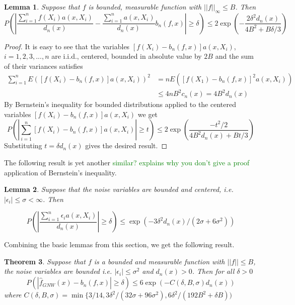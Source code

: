 \documentclass{article}
\newtheorem{theorem}{Theorem}[section]
\newtheorem{lemma}[theorem]{Lemma}
\newcommand\SB[1]{\textcolor{green}{#1}}
\begin{document}
\begin{lemma}
\label{basic_lemma_1}
Suppose that $f$ is bounded, measurable function with  $||f||_{\infty}\leq B$. Then 
\begin{equation*}
P(|\frac{\sum_{i=1}^nf(X_i)a(x,X_i)}{d_n(x)}-\frac{\sum_{i=1}^na(x,X_i)}{d_n(x)}b_n(f,x)|\geq \delta)\leq 2\exp(-\frac{2\delta^2d_n(x)}{4B^2+B\delta/3})
\end{equation*}
\end{lemma}
\begin{proof}
It is easy to see that the variables  $[f(X_i)-b_n(f,x)]a(x,X_i)$, $i=1,2,3,...,n$ are i.i.d., centered, bounded in absolute value by $2B$ and the sum of their variances satisfies 
\begin{equation*}
\begin{split}
    \sum_{i=1}^nE([f(X_i)-b_n(f,x)]a(x,X_i))^2&=nE([f(X_1)-b_n(f,x)]^2a(x,X_i))\\
    &\leq 4nB^2c_n(x)=4B^2d_n(x)
\end{split}
\end{equation*}
By Bernstein's inequality for bounded distributions applied to the centered variables $[f(X_i)-b_n(f,x)]a(x,X_i)$ we get
\begin{equation*}
    P(|\sum_{i=1}^n[f(X_i)-b_n(f,x)]a(x,X_i)|\geq t)\leq 2\exp(\frac{-t^2/2}{4B^2d_n(x)+Bt/3})
\end{equation*}
Substituting $t=\delta d_n(x)$ gives the desired result.
\end{proof}
The following result is yet another \SB{similar? explains why you don't give a
  proof} application of Bernstein's inequality.
\begin{lemma}
\label{basic_lemma_2}
Suppose that the noise variables are bounded and centered, i.e. $|\epsilon_i|\leq \sigma<\infty$. Then

\begin{equation*}
    P(|\frac{\sum_{i=1}^n \epsilon_{i}a(x,X_i)}{d_n(x)}|\geq \delta)\leq \exp(-3\delta^2d_n(x)/(2\sigma+6\sigma^2))
\end{equation*}
\end{lemma}
Combining the basic lemmas from this section, we get the following result.
\begin{theorem}
\label{basic_cor_2}
Suppose that $f$ is a bounded and measurable function with $||f||\leq B$, the noise variables are bounded i.e. $|\epsilon_i|\leq \sigma^2$ and $d_n(x)>0$. Then for all $\delta>0$
\begin{equation*}
    P(|\hat{f}_{GNW}(x)-b_n(f,x)|\geq \delta)\leq 6\exp(-C(\delta,B,\sigma)d_n(x))
\end{equation*}
where $C(\delta,B,\sigma)=\min\{3/14,3\delta^2/(32\sigma+96\sigma^2),6\delta^2/(192B^2+\delta B))$
\end{theorem}
 
\end{document}
